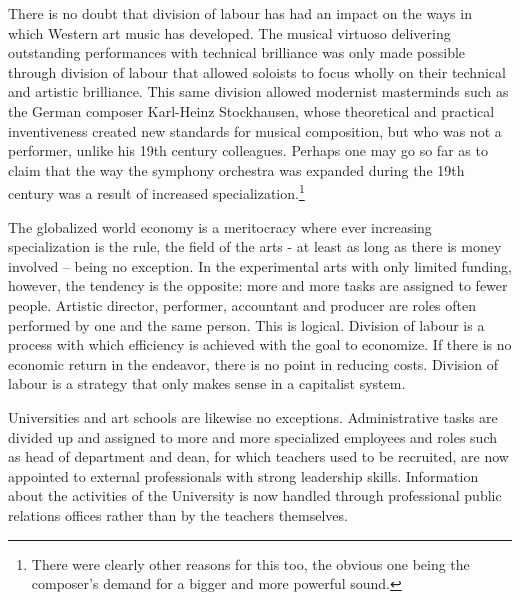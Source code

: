 \documentclass[12pt]{article}
\begin{document}
There is no doubt that division of labour has had an impact on the ways in which Western art music has developed. The musical virtuoso delivering outstanding performances with technical brilliance was only made possible through division of labour that allowed soloists to focus wholly on their technical and artistic brilliance. This same division allowed modernist masterminds such as the German composer Karl-Heinz Stockhausen, whose theoretical and practical inventiveness created new standards for musical composition, but who was not a performer, unlike his 19th century colleagues. Perhaps one may go so far as to claim that the way the symphony orchestra was expanded during the 19th century was a result of increased specialization.\footnote{There were clearly other reasons for this too, the obvious one being the composer's demand for a bigger and more powerful sound.}

The globalized world economy is a meritocracy where ever increasing specialization is the rule, the field of the arts - at least as long as there is money involved – being no exception. In the experimental arts with only limited funding, however, the tendency is the opposite: more and more tasks are assigned to fewer people. Artistic director, performer, accountant and producer are roles often performed by one and the same person. This is logical. Division of labour is a process with which efficiency is achieved with the goal to economize. If there is no economic return in the endeavor, there is no point in reducing costs. Division of labour is a strategy that only makes sense in a capitalist system.
 
Universities and art schools are likewise no exceptions. Administrative tasks are divided up and assigned to more and more specialized employees and roles such as head of department and dean, for which teachers used to be recruited, are now appointed to external professionals with strong leadership skills. Information about the activities of the University is now handled through professional public relations offices rather than by the teachers themselves. 
\end{document}
